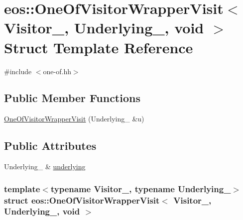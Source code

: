 \hypertarget{structeos_1_1OneOfVisitorWrapperVisit_3_01Visitor___00_01Underlying___00_01void_01_4}{
\section{eos::OneOfVisitorWrapperVisit$<$ Visitor\_\-, Underlying\_\-, void $>$ Struct Template Reference}
\label{structeos_1_1OneOfVisitorWrapperVisit_3_01Visitor___00_01Underlying___00_01void_01_4}
}


{\ttfamily \#include $<$one-\/of.hh$>$}\subsection*{Public Member Functions}
\begin{DoxyCompactItemize}
\item 
\hyperlink{structeos_1_1OneOfVisitorWrapperVisit_3_01Visitor___00_01Underlying___00_01void_01_4_a1b80f2f7d8924acef3cc5ea108ee7c86}{OneOfVisitorWrapperVisit} (Underlying\_\- \&u)
\end{DoxyCompactItemize}
\subsection*{Public Attributes}
\begin{DoxyCompactItemize}
\item 
Underlying\_\- \& \hyperlink{structeos_1_1OneOfVisitorWrapperVisit_3_01Visitor___00_01Underlying___00_01void_01_4_af5c9cf70707be6778717c39739b2a962}{underlying}
\end{DoxyCompactItemize}
\subsubsection*{template$<$typename Visitor\_\-, typename Underlying\_\-$>$ struct eos::OneOfVisitorWrapperVisit$<$ Visitor\_\-, Underlying\_\-, void $>$}



